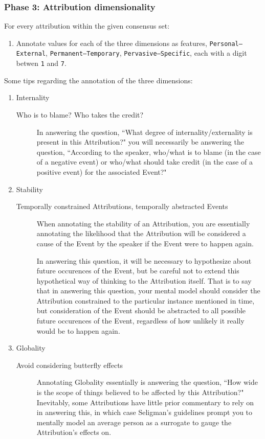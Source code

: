 \documentclass[a4paper,12pt]{article}
\begin{document}
    \subsubsection{Phase 3: Attribution dimensionality}
    For every attribution within the given consensus set:
        \begin{enumerate}
            \item Annotate values for each of the three dimensions as features, \texttt{Personal--External}, \texttt{Permanent--Temporary}, \texttt{Pervasive--Specific}, each with a digit betwen \texttt{1} and \texttt{7}.
        \end{enumerate}
    \noindent Some tips regarding the annotation of the three dimensions:
        \begin{enumerate}
        \item Internality
            \begin{description}
                \item[Who is to blame? Who takes the credit?] In answering the question, ``What degree of internality/externality is present in this Attribution?" you will necessarily be answering the question, ``According to the speaker, who/what is to blame (in the case of a negative event) or who/what should take credit (in the case of a positive event) for the associated Event?"
            \end{description}
        \item Stability
            \begin{description}
                \item[Temporally constrained Attributions, temporally abstracted Events] When annotating the stability of an Attribution, you are essentially annotating the likelihood that the Attribution will be considered a cause of the Event by the speaker if the Event were to happen again.

                    In answering this question, it will be necessary to hypothesize about future occurences of the Event, but be careful not to extend this hypothetical way of thinking to the Attribution itself. That is to say that in answering this question, your mental model should consider the Attribution constrained to the particular instance mentioned in time, but consideration of the Event should be abstracted to all possible future occurences of the Event, regardless of how unlikely it really would be to happen again.
            \end{description}
        \item Globality
            \begin{description}
                \item[Avoid considering butterfly effects] Annotating Globality essentially is answering the question, ``How wide is the scope of things believed to be affected by this Attribution?" Inevitably, some Attributions have little prior commentary to rely on in answering this, in which case Seligman's guidelines prompt you to mentally model an average person as a surrogate to gauge the Attribution's effects on.


\end{description}
\end{enumerate}
\end{document}
